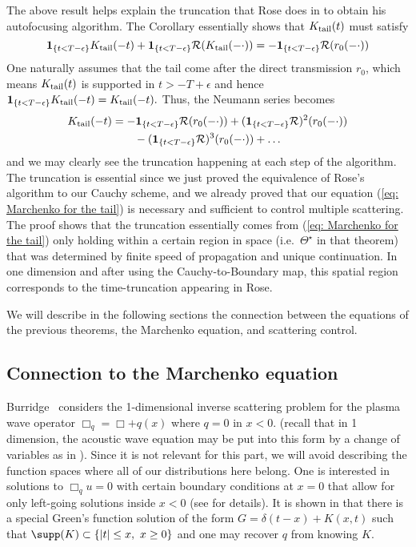 \documentclass[10pt]{article}
\theoremstyle{plain}
\theoremstyle{definition}
\theoremstyle{remark}
\numberwithin{theorem}{section}
\numberwithin{example}{section}
\numberwithin{equation}{section}
\numberwithin{figure}{section}
\def \R{\mathcal{R}}
\newcommand\tail{_{\textup{tail}}}
\begin{document}
 \begin{rem}
 The above result helps explain the truncation that Rose does in \cite{Rose02} to obtain his autofocusing algorithm.
 The Corollary essentially shows that $K\tail(t)$ must satisfy
 $$ \mathbf{1}_{\{t<T-\epsilon\}}K\tail(-t) + \mathbf{1}_{\{t<T-\epsilon\}}\R(K\tail(-\cdot)) = - \mathbf{1}_{\{t<T-\epsilon\}}\R(r_0(-\cdot))$$
One naturally assumes that the tail come after the direct transmission $r_0$, which means $K\tail(t)$ is supported in $t > -T+\epsilon$ and hence
 $ \mathbf{1}_{\{t<T-\epsilon\}}K\tail(-t) = K\tail(-t).$
 Thus, the Neumann series becomes
  \begin{align*}
  K\tail(-t) &= -\mathbf{1}_{\{t<T-\epsilon\}}\R(r_0(-\cdot))
 + (\mathbf{1}_{\{t<T-\epsilon\}}\R)^2(r_0(-\cdot))
\\
 &\qquad - (\mathbf{1}_{\{t<T-\epsilon\}}\R)^3(r_0(-\cdot))
 + \dots
\end{align*}
 and we may clearly see the truncation happening at each step of the algorithm. The truncation is essential since we just proved the equivalence of Rose's algorithm to our Cauchy scheme, and we already proved that our equation (\ref{eq: Marchenko for the tail}) is necessary and sufficient to control multiple scattering. The proof shows that the truncation essentially comes from (\ref{eq: Marchenko for the tail}) only holding within a certain region in space (i.e.~$\Theta^\star$ in that theorem) that was determined by finite speed of propagation and unique continuation. In one dimension and after using the Cauchy-to-Boundary map, this spatial region corresponds to the time-truncation appearing in Rose.
 \end{rem}
We will describe in the following sections the connection between the equations of the previous theorems, the Marchenko equation, and scattering control.

 \subsection{Connection to the Marchenko equation}
Burridge~\cite{Bur80} considers the 1-dimensional inverse scattering problem for the plasma wave operator $\Box_q = \Box + q(x)$ where $q = 0$ in $x<0$. (recall that in 1 dimension, the acoustic wave equation may be put into this form by a change of variables as in \cite{Bur80}). Since it is not relevant for this part, we will avoid describing the function spaces where all of our distributions here belong. One is interested in solutions to $ \Box_q u = 0$ with certain boundary conditions at $x=0$ that allow for only left-going solutions inside $x<0$ (see \cite[Section 3]{Bur80} for details).
 It is shown in \cite{Bur80} that there is a special Green's function  solution of the form
 $G = \delta(t-x) + K(x,t)$ such that $\supp(K) \subset \{ |t| \leq x, \ x \geq 0 \}$ and one may recover $q$ from knowing $K$.
\end{document}
